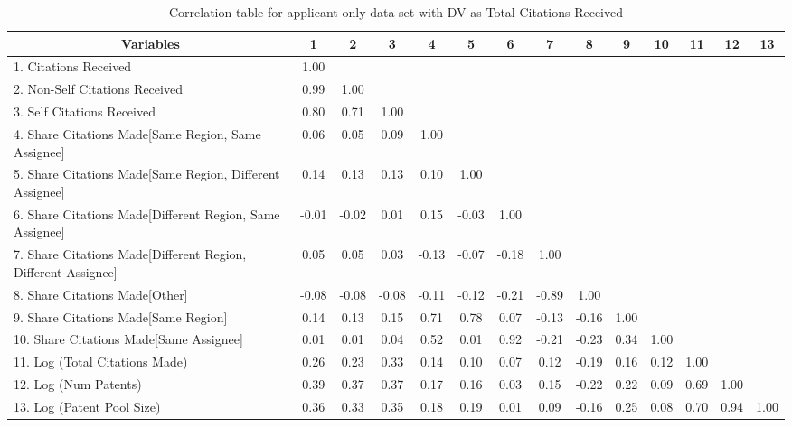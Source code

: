 \begin{table}[htbp]\centering \caption{Correlation table for applicant only data set with DV as Total Citations Received\label{a.tcorrelation}}
\scriptsize
\singlespacing
\begin{tabular}{l  c  c  c  c  c  c  c  c  c  c  c  c  c }\hline\hline
\multicolumn{1}{c}{Variables} &1&2&3&4&5&6&7&8&9&10&11&12&13\\ \hline
1. Citations Received&1.00\\
2. Non-Self Citations Received&0.99&1.00\\
3. Self Citations Received&0.80&0.71&1.00\\
4. Share Citations Made[Same Region, Same Assignee]&0.06&0.05&0.09&1.00\\
5. Share Citations Made[Same Region, Different Assignee]&0.14&0.13&0.13&0.10&1.00\\
6. Share Citations Made[Different Region, Same Assignee]&-0.01&-0.02&0.01&0.15&-0.03&1.00\\
7. Share Citations Made[Different Region, Different Assignee]&0.05&0.05&0.03&-0.13&-0.07&-0.18&1.00\\
8. Share Citations Made[Other]&-0.08&-0.08&-0.08&-0.11&-0.12&-0.21&-0.89&1.00\\
9. Share Citations Made[Same Region]&0.14&0.13&0.15&0.71&0.78&0.07&-0.13&-0.16&1.00\\
10. Share Citations Made[Same Assignee]&0.01&0.01&0.04&0.52&0.01&0.92&-0.21&-0.23&0.34&1.00\\
11. Log (Total Citations Made)&0.26&0.23&0.33&0.14&0.10&0.07&0.12&-0.19&0.16&0.12&1.00\\
12. Log (Num Patents)&0.39&0.37&0.37&0.17&0.16&0.03&0.15&-0.22&0.22&0.09&0.69&1.00\\
13. Log (Patent Pool Size)&0.36&0.33&0.35&0.18&0.19&0.01&0.09&-0.16&0.25&0.08&0.70&0.94&1.00\\
\hline \hline 
 \end{tabular}
\end{table}
